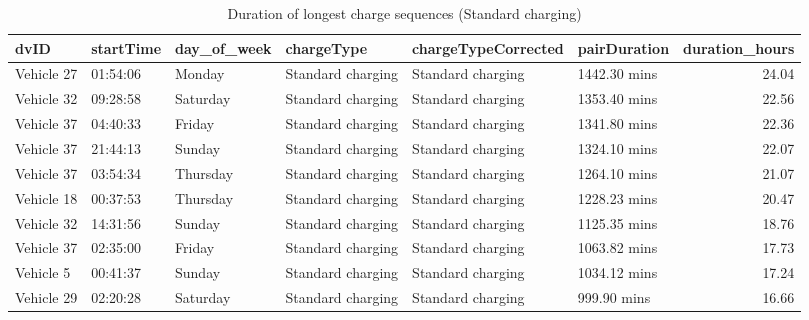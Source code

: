 \documentclass[]{article}
\begin{document}
\begin{table}[t]

\caption{\label{tab:durationLongTableStd}Duration of longest charge sequences (Standard charging)}
\centering
\begin{tabular}{l|l|l|l|l|l|r}
\hline
dvID & startTime & day\_of\_week & chargeType & chargeTypeCorrected & pairDuration & duration\_hours\\
\hline
Vehicle 27 & 01:54:06 & Monday & Standard charging & Standard charging & 1442.30 mins & 24.04\\
\hline
Vehicle 32 & 09:28:58 & Saturday & Standard charging & Standard charging & 1353.40 mins & 22.56\\
\hline
Vehicle 37 & 04:40:33 & Friday & Standard charging & Standard charging & 1341.80 mins & 22.36\\
\hline
Vehicle 37 & 21:44:13 & Sunday & Standard charging & Standard charging & 1324.10 mins & 22.07\\
\hline
Vehicle 37 & 03:54:34 & Thursday & Standard charging & Standard charging & 1264.10 mins & 21.07\\
\hline
Vehicle 18 & 00:37:53 & Thursday & Standard charging & Standard charging & 1228.23 mins & 20.47\\
\hline
Vehicle 32 & 14:31:56 & Sunday & Standard charging & Standard charging & 1125.35 mins & 18.76\\
\hline
Vehicle 37 & 02:35:00 & Friday & Standard charging & Standard charging & 1063.82 mins & 17.73\\
\hline
Vehicle 5 & 00:41:37 & Sunday & Standard charging & Standard charging & 1034.12 mins & 17.24\\
\hline
Vehicle 29 & 02:20:28 & Saturday & Standard charging & Standard charging & 999.90 mins & 16.66\\
\hline
\end{tabular}
\end{table}
\end{document}
